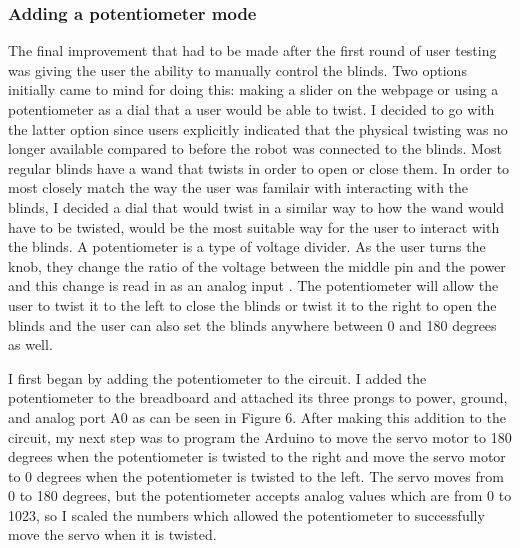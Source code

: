 \documentclass[10pt,twocolumn]{article}
\begin{document}
\subsubsection{Adding a potentiometer mode}
The final improvement that had to be made after the first round of user testing was giving the user the ability to manually control the blinds. Two options initially came to mind for doing this: making a slider on the webpage or using a potentiometer as a dial that a user would be able to twist. I decided to go with the latter option since users explicitly indicated that the physical twisting was no longer available compared to before the robot was connected to the blinds. Most regular blinds have a wand that twists in order to open or close them. In order to most closely match the way the user was familair with interacting with the blinds, I decided a dial that would twist in a similar way to how the wand would have to be twisted, would be the most suitable way for the user to interact with the blinds. A potentiometer is a type of voltage divider. As the user turns the knob, they change the ratio of the voltage between the middle pin and the power and this change is read in as an analog input \cite{Fitzgerald2015Arduino}. The potentiometer will allow the user to twist it to the left to close the blinds or twist it to the right to open the blinds and the user can also set the blinds anywhere between 0 and 180 degrees as well.

I first began by adding the potentiometer to the circuit. I added the potentiometer to the breadboard and attached its three prongs to power, ground, and analog port A0 as can be seen in Figure 6. After making this addition to the circuit, my next step was to program the Arduino to move the servo motor to 180 degrees when the potentiometer is twisted to the right and move the servo motor to 0 degrees when the potentiometer is twisted to the left. The servo moves from 0 to 180 degrees, but the potentiometer accepts analog values which are from 0 to 1023, so I scaled the numbers which allowed the potentiometer to successfully move the servo when it is twisted.
\end{document}
